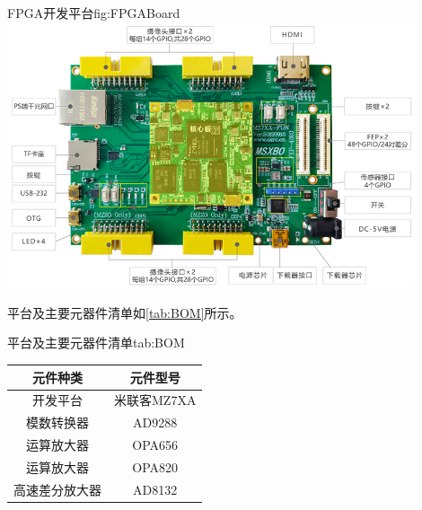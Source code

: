 \documentclass[supercite]{HustGraduPaper}
\begin{document}
\begin{appendices}
		\begin{generalfig}[htb]{FPGA开发平台}{fig:FPGABoard}
			\includegraphics[width=12cm]{Figures/FPGABoard.jpg}
		\end{generalfig}
	
		平台及主要元器件清单如\autoref{tab:BOM}所示。
		\begin{generaltab}{平台及主要元器件清单}{tab:BOM}
			\begin{tabularx}{10cm}{CC}
				\toprule
				元件种类& 元件型号       \\
				\midrule
				开发平台 & 米联客MZ7XA      \\
				模数转换器 & AD9288     \\
				运算放大器 & OPA656     \\
				运算放大器 & OPA820     \\
				高速差分放大器 & AD8132     \\
				\bottomrule
			\end{tabularx}
		\end{generaltab}
	
	\end{appendices}
	
\end{document}

